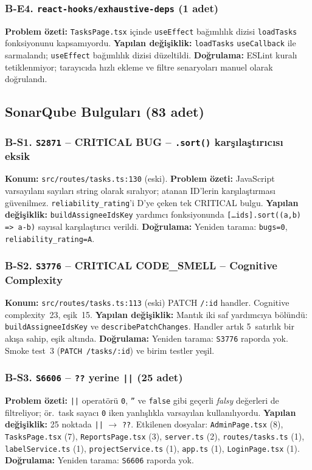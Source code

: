 \documentclass[conference]{IEEEtran}
\begin{document}
\subsubsection{B-E4. \texttt{react-hooks/exhaustive-deps} (1 adet)}
\textbf{Problem özeti:} \texttt{TasksPage.tsx} içinde \texttt{useEffect}
bağımlılık dizisi \texttt{loadTasks} fonksiyonunu kapsamıyordu.
\textbf{Yapılan değişiklik:} \texttt{loadTasks} \texttt{useCallback}
ile sarmalandı; \texttt{useEffect} bağımlılık dizisi düzeltildi.
\textbf{Doğrulama:} ESLint kuralı tetiklenmiyor; tarayıcıda hızlı ekleme
ve filtre senaryoları manuel olarak doğrulandı.

\subsection{SonarQube Bulguları (83 adet)}

\subsubsection{B-S1. \texttt{S2871} -- CRITICAL BUG -- \texttt{.sort()}
karşılaştırıcısı eksik}
\textbf{Konum:} \texttt{src/routes/tasks.ts:130} (eski).
\textbf{Problem özeti:} JavaScript varsayılanı sayıları string olarak
sıralıyor; atanan ID'lerin karşılaştırması güvenilmez.
\texttt{reliability\_rating}'i D'ye çeken tek CRITICAL bulgu.
\textbf{Yapılan değişiklik:} \texttt{buildAssigneeIdsKey} yardımcı
fonksiyonunda \texttt{[\dots ids].sort((a,b) => a-b)} sayısal
karşılaştırıcı verildi.
\textbf{Doğrulama:} Yeniden tarama: \texttt{bugs=0},
\texttt{reliability\_rating=A}.

\subsubsection{B-S2. \texttt{S3776} -- CRITICAL CODE\_SMELL -- Cognitive
Complexity}
\textbf{Konum:} \texttt{src/routes/tasks.ts:113} (eski) PATCH \texttt{/:id}
handler. Cognitive complexity~23, eşik~15.
\textbf{Yapılan değişiklik:} Mantık iki saf yardımcıya bölündü:
\texttt{buildAssigneeIdsKey} ve \texttt{describePatchChanges}. Handler
artık 5~satırlık bir akışa sahip, eşik altında.
\textbf{Doğrulama:} Yeniden tarama: \texttt{S3776} raporda yok.
Smoke test~3 (\texttt{PATCH /tasks/:id}) ve birim testler yeşil.

\subsubsection{B-S3. \texttt{S6606} -- \texttt{??} yerine \texttt{||} (25 adet)}
\textbf{Problem özeti:} \texttt{||} operatörü \texttt{0}, \texttt{''} ve
\texttt{false} gibi geçerli \emph{falsy} değerleri de filtreliyor; ör.\ task
sayacı \texttt{0} iken yanlışlıkla varsayılan kullanılıyordu.
\textbf{Yapılan değişiklik:} 25 noktada \texttt{||} $\to$ \texttt{??}.
Etkilenen dosyalar: \texttt{AdminPage.tsx} (8), \texttt{TasksPage.tsx} (7),
\texttt{ReportsPage.tsx} (3), \texttt{server.ts} (2),
\texttt{routes/tasks.ts} (1), \texttt{labelService.ts} (1),
\texttt{projectService.ts} (1), \texttt{app.ts} (1),
\texttt{LoginPage.tsx} (1).
\textbf{Doğrulama:} Yeniden tarama: \texttt{S6606} raporda yok.
\end{document}
